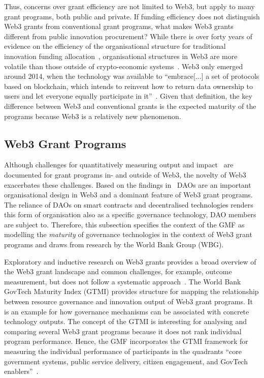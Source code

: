 \documentclass[conference]{IEEEtran}
\begin{document}
Thus, concerns over grant efficiency are not limited to Web3, but apply to many grant programs, both public and private. If funding efficiency does not distinguish Web3 grants from conventional grant programs, what makes Web3 grants different from public innovation procurement? While there is over forty years of evidence on the efficiency of the organisational structure for traditional innovation funding allocation~\cite[p.~4]{holmstrom_agency_1989}, organisational structures in Web3 are more volatile than those outside of crypto-economic systems~\cite[p.~25]{zuo_development_2023}. Web3 only emerged around 2014, when the technology was available to ``embrace[...] a set of protocols based on blockchain, which intends to reinvent how to return data ownership to users and let everyone equally participate in it''~\cite[p.~4]{wan_web3_2023}. Given that definition, the key difference between Web3 and conventional grants is the expected maturity of the programs because Web3 is a relatively new phenomenon.

\subsection{Web3 Grant Programs}\label{sec_2.1}

Although challenges for quantitatively measuring output and impact~\cite{ding_desci_2022,howell_financing_2017} are documented for grant programs in- and outside of Web3, the novelty of Web3 exacerbates these challenges. Based on the findings in~\cite{ding_desci_2022,wan_web3_2023} DAOs are an important organisational design in Web3 and a dominant feature of Web3 grant programs. The reliance of DAOs on smart contracts and decentralised technologies renders this form of organisation also as a specific governance technology, DAO members are subject to. Therefore, this subsection specifies the context of the GMF as modelling the \textit{maturity} of governance technologies in the context of Web3 grant programs and draws from research by the World Bank Group (WBG).

Exploratory and inductive research on Web3 grants provides a broad overview of the Web3 grant landscape and common challenges, for example, outcome measurement, but does not follow a systematic approach~\cite{leventhal_state_2023_long,leventhal_state_2024}. The World Bank GovTech Maturity Index (GTMI) provides structure for mapping the relationship between resource governance and innovation output of Web3 grant programs. It is an example for how governance mechanisms can be associated with concrete technology outputs. The concept of the GTMI is interesting for analysing and comparing several Web3 grant programs because it does not rank individual program performance. Hence, the GMF incorporates the GTMI framework for measuring the individual performance of participants in the quadrants ``core government systems, public service delivery, citizen engagement, and GovTech enablers''~\cite[p.~5]{dener_govtech_2021}.
\end{document}
